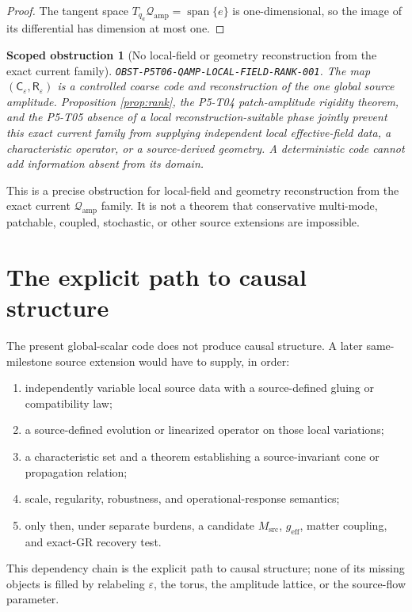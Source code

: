 \documentclass[11pt]{article}
\newcommand{\Qamp}{\mathcal Q_{\mathrm{amp}}}
\newcommand{\Ceps}{\mathsf C_\varepsilon}
\newcommand{\Reps}{\mathsf R_\varepsilon}
\newtheorem{obstruction}{Scoped obstruction}
\begin{document}
\begin{proof}
The tangent space \(T_{q_a}\Qamp=\operatorname{span}\{e\}\) is
one-dimensional, so the image of its differential has dimension at most one.
\end{proof}

\begin{obstruction}[No local-field or geometry reconstruction from the exact
current family]
\label{obs:local-field}
\texttt{OBST-P5T06-QAMP-LOCAL-FIELD-RANK-001}.  The map
\((\Ceps,\Reps)\) is a controlled coarse code and reconstruction of the one
global source amplitude.  Proposition \ref{prop:rank}, the P5-T04
patch-amplitude rigidity theorem, and the P5-T05 absence of a local
reconstruction-suitable phase jointly prevent this exact current family from
supplying independent local effective-field data, a characteristic operator,
or a source-derived geometry.  A deterministic code cannot add information
absent from its domain.
\end{obstruction}

This is a precise obstruction for local-field and geometry reconstruction
from the exact current \(\Qamp\) family.  It is not a theorem that conservative
multi-mode, patchable, coupled, stochastic, or other source extensions are
impossible.

\section{The explicit path to causal structure}

The present global-scalar code does not produce causal structure.  A later
same-milestone source extension would have to supply, in order:
\begin{enumerate}
 \item independently variable local source data with a source-defined gluing
 or compatibility law;
 \item a source-defined evolution or linearized operator on those local
 variations;
 \item a characteristic set and a theorem establishing a source-invariant
 cone or propagation relation;
 \item scale, regularity, robustness, and operational-response semantics;
 \item only then, under separate burdens, a candidate \(M_{\mathrm{src}}\),
 \(g_{\mathrm{eff}}\), matter coupling, and exact-GR recovery test.
\end{enumerate}
This dependency chain is the explicit path to causal structure; none of its
missing objects is filled by relabeling \(\varepsilon\), the torus, the
amplitude lattice, or the source-flow parameter.
\end{document}
